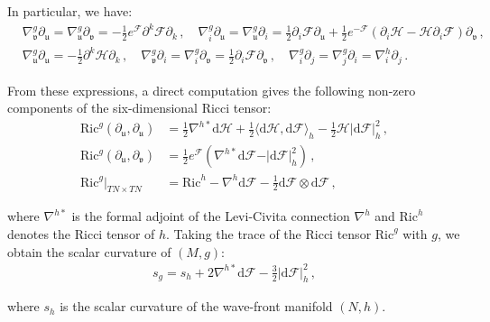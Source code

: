 \documentclass[10pt,a4paper,twoside,reqno]{amsart}
\theoremstyle{plain}
\theoremstyle{definition}
\theoremstyle{remark}
\def\dd{\mathrm{d}}
\def\cH{\mathcal{H}}
\def\cF{\mathcal{F}}
\def\cH{\mathcal{H}}
\def\dd{\mathrm{d}}
\def\fru{\mathfrak{u}}
\def\frv{\mathfrak{v}}
\begin{document}
\noindent
In particular, we have:
\begin{eqnarray*} 
& \nabla^g_{\frv}\partial_{\fru}   =  \nabla^g_{\fru}\partial_{\frv} =    - \frac{1}{2} e^{\cF} \partial^k \cF \partial_k \, , \quad \nabla^g_{i}\partial_{\fru}   = \nabla^g_{\fru}\partial_{i}  =  \frac{1}{2} \partial_i \cF \partial_{\fru} + \frac{1}{2} e^{-\cF} ( \partial_i \cH -   \cH  \partial_i \cF ) \partial_{\frv}\, ,\\ 
& \nabla^g_{\fru}\partial_{\fru}  =   - \frac{1}{2} \partial^k \cH \partial_k\, , \quad \nabla^g_{\frv} \partial_{i} = \nabla^g_{i} \partial_{\frv} = \frac{1}{2}\partial_i \cF \partial_{\frv}\, , \quad  \nabla^g_{i}\partial_j =  \nabla^g_{j}\partial_i  = \nabla^h_{i}\partial_j\, .
\end{eqnarray*} 

\noindent
From these expressions, a direct computation gives the following non-zero components of the six-dimensional Ricci tensor:
\begin{equation}\label{eq:Riccitensor}
\begin{aligned}
\mathrm{Ric}^g(\partial_{\fru} , \partial_{\fru}) &= \frac{1}{2} \nabla^{h\ast} \dd\cH + \frac{1}{2} \langle \dd\cH, \dd\cF \rangle_h - \frac{1}{2} \cH \vert \dd\cF \vert^2_h \, ,\\
\mathrm{Ric}^g(\partial_{\fru} , \partial_{\frv}) &=  \frac{1}{2} e^{\cF} \left( \nabla^{h\ast}\dd \cF - \vert \dd\cF \vert^2_h \right) \, ,\\
\mathrm{Ric}^g\vert_{TN\times TN} &= \mathrm{Ric}^h - \nabla^h \dd \cF - \frac{1}{2} \dd \cF \otimes \dd \cF\, ,
\end{aligned}
\end{equation}

\noindent
where $\nabla^{h\ast}$ is the formal adjoint of the Levi-Civita connection $\nabla^h$ and $\mathrm{Ric}^h$ denotes the Ricci tensor of $h$. Taking the trace of the Ricci tensor $\mathrm{Ric}^g$ with $g$, we obtain the scalar curvature of $(M,g)$:
\begin{eqnarray*}
s_g = s_h + 2 \nabla^{h\ast}\dd \cF  - \frac{3}{2} \vert \dd\cF \vert^2_h \, ,
\end{eqnarray*}

\noindent
where $s_h$ is the scalar curvature of the wave-front manifold $(N,h)$.
\end{document}
